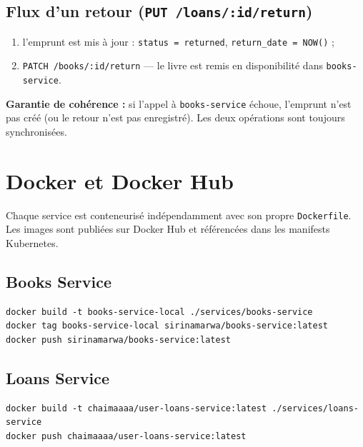 \documentclass[12pt,a4paper]{article}
\begin{document}
\subsection{Flux d'un retour (\texttt{PUT /loans/:id/return})}

\begin{enumerate}[leftmargin=*]
  \item l'emprunt est mis à jour : \texttt{status = returned}, \texttt{return\_date = NOW()} ;
  \item \texttt{PATCH /books/:id/return} --- le livre est remis en disponibilité dans \texttt{books-service}.
\end{enumerate}

\begin{infobox}
\textbf{Garantie de cohérence :} si l'appel à \texttt{books-service} échoue, l'emprunt n'est pas
créé (ou le retour n'est pas enregistré). Les deux opérations sont toujours synchronisées.
\end{infobox}

\section{Docker et Docker Hub}

Chaque service est conteneurisé indépendamment avec son propre \texttt{Dockerfile}.
Les images sont publiées sur Docker Hub et référencées dans les manifests Kubernetes.

\subsection{Books Service}

\begin{Verbatim}[breaklines=true,breakanywhere=true]
docker build -t books-service-local ./services/books-service
docker tag books-service-local sirinamarwa/books-service:latest
docker push sirinamarwa/books-service:latest
\end{Verbatim}

\subsection{Loans Service}

\begin{Verbatim}[breaklines=true,breakanywhere=true]
docker build -t chaimaaaa/user-loans-service:latest ./services/loans-service
docker push chaimaaaa/user-loans-service:latest
\end{Verbatim}
\end{document}
